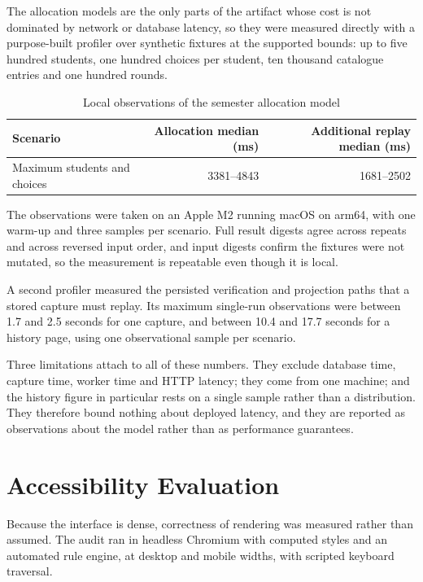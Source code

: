 The allocation models are the only parts of the artifact whose cost is not dominated by network or
database latency, so they were measured directly with a purpose-built profiler over synthetic
fixtures at the supported bounds: up to five hundred students, one hundred choices per student, ten
thousand catalogue entries and one hundred rounds.

\begin{table}[h]
\centering
\small
\begin{tabular}{lrr}
\toprule
\textbf{Scenario} & \textbf{Allocation median (ms)} & \textbf{Additional replay median (ms)} \\
\midrule
Maximum students and choices & 3381--4843 & 1681--2502 \\
\bottomrule
\end{tabular}
\caption{Local observations of the semester allocation model}
\end{table}

The observations were taken on an Apple M2 running macOS on arm64, with one warm-up and three
samples per scenario. Full result digests agree across repeats and across reversed input order, and
input digests confirm the fixtures were not mutated, so the measurement is repeatable even though it
is local.

A second profiler measured the persisted verification and projection paths that a stored capture
must replay. Its maximum single-run observations were between 1.7 and 2.5 seconds for one capture,
and between 10.4 and 17.7 seconds for a history page, using one observational sample per scenario.

Three limitations attach to all of these numbers. They exclude database time, capture time, worker
time and HTTP latency; they come from one machine; and the history figure in particular rests on a
single sample rather than a distribution. They therefore bound nothing about deployed latency, and
they are reported as observations about the model rather than as performance guarantees.

\section{Accessibility Evaluation}

Because the interface is dense, correctness of rendering was measured rather than assumed. The audit
ran in headless Chromium with computed styles and an automated rule engine, at desktop and mobile
widths, with scripted keyboard traversal.


